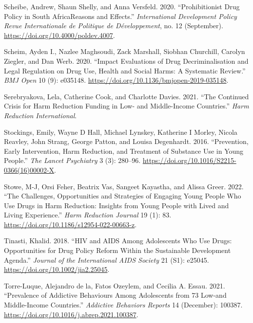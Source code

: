 \documentclass[
  letterpaper,
  DIV=11,
  numbers=noendperiod]{scrartcl}
\newlength{\cslhangindent}
\newenvironment{CSLReferences}[2] %
 {\begin{list}{}{%
  \setlength{\itemindent}{0pt}
  \setlength{\leftmargin}{0pt}
  \setlength{\parsep}{0pt}
  \ifodd #1
   \setlength{\leftmargin}{\cslhangindent}
   \setlength{\itemindent}{-1\cslhangindent}
  \fi
  \setlength{\itemsep}{#2\baselineskip}}}
 {\end{list}}
\begin{document}
\begin{CSLReferences}{1}{0}
Scheibe, Andrew, Shaun Shelly, and Anna Versfeld. 2020.
{``Prohibitionist Drug Policy in South Africa{\textemdash}Reasons and
Effects.''} \emph{International Development Policy \textbar{} Revue
Internationale de Politique de Développement}, no. 12 (September).
\url{https://doi.org/10.4000/poldev.4007}.

Scheim, Ayden I., Nazlee Maghsoudi, Zack Marshall, Siobhan Churchill,
Carolyn Ziegler, and Dan Werb. 2020. {``Impact Evaluations of Drug
Decriminalisation and Legal Regulation on Drug Use, Health and Social
Harms: A Systematic Review.''} \emph{BMJ Open} 10 (9): e035148.
\url{https://doi.org/10.1136/bmjopen-2019-035148}.

Serebryakova, Lela, Catherine Cook, and Charlotte Davies. 2021. {``The
Continued Crisis for Harm Reduction Funding in Low- and Middle-Income
Countries.''} \emph{Harm Reduction International}.

Stockings, Emily, Wayne D Hall, Michael Lynskey, Katherine I Morley,
Nicola Reavley, John Strang, George Patton, and Louisa Degenhardt. 2016.
{``Prevention, Early Intervention, Harm Reduction, and Treatment of
Substance Use in Young People.''} \emph{The Lancet Psychiatry} 3 (3):
280--96. \url{https://doi.org/10.1016/S2215-0366(16)00002-X}.

Stowe, M-J, Orsi Feher, Beatrix Vas, Sangeet Kayastha, and Alissa Greer.
2022. {``The Challenges, Opportunities and Strategies of Engaging Young
People Who Use Drugs in Harm Reduction: Insights from Young People with
Lived and Living Experience.''} \emph{Harm Reduction Journal} 19 (1):
83. \url{https://doi.org/10.1186/s12954-022-00663-z}.

Tinasti, Khalid. 2018. {``HIV and AIDS Among Adolescents Who Use Drugs:
Opportunities for Drug Policy Reform Within the Sustainable Development
Agenda.''} \emph{Journal of the International AIDS Society} 21 (S1):
e25045. \url{https://doi.org/10.1002/jia2.25045}.

Torre-Luque, Alejandro de la, Fatos Ozeylem, and Cecilia A. Essau. 2021.
{``Prevalence of Addictive Behaviours Among Adolescents from 73 Low-and
Middle-Income Countries.''} \emph{Addictive Behaviors Reports} 14
(December): 100387. \url{https://doi.org/10.1016/j.abrep.2021.100387}.


\end{CSLReferences}
\end{document}
